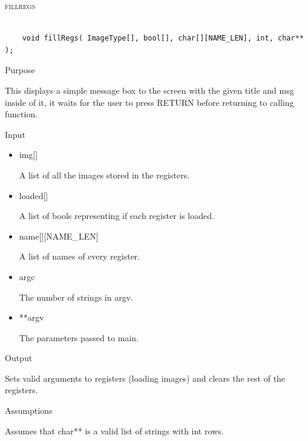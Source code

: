 \documentclass[pdftex, 11pt]{article}
\begin{document}
\begin{description}
	\item{\textsc{fillregs}}

		\begin{lstlisting}

	void fillRegs( ImageType[], bool[], char[][NAME_LEN], int, char** );
		\end{lstlisting}

		\begin{description}
			\item{Purpose}

				This displays a simple message box to the screen with the given title and msg
				inside of it, it waits for the user to press RETURN before returning to
				calling function.

			\item{Input}

				\begin{itemize}

					\item{img[]}

						A list of all the images stored in the registers.

					\item{loaded[]}

						A list of bools representing if each register is loaded.

					\item{name[][NAME\_LEN]}

						A list of names of every register.
					
					\item{argc}

						The number of strings in argv.

					\item{**argv}

						The parameters passed to main.

				\end{itemize}

			\item{Output}

				Sets valid arguments to registers (loading images) and
				clears the rest of the registers.

			\item{Assumptions}

				Assumes that char** is a valid list of strings with int
				rows.

		\end{description}




\end{description}
\end{document}
